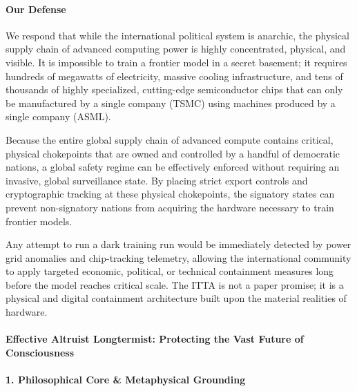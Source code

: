 \paragraph{Our Defense}\label{our-defense-2}

We respond that while the international political system is anarchic,
the physical supply chain of advanced computing power is highly
concentrated, physical, and visible. It is impossible to train a
frontier model in a secret basement; it requires hundreds of megawatts
of electricity, massive cooling infrastructure, and tens of thousands of
highly specialized, cutting-edge semiconductor chips that can only be
manufactured by a single company (TSMC) using machines produced by a
single company (ASML).

Because the entire global supply chain of advanced compute contains
critical, physical chokepoints that are owned and controlled by a
handful of democratic nations, a global safety regime can be effectively
enforced without requiring an invasive, global surveillance state. By
placing strict export controls and cryptographic tracking at these
physical chokepoints, the signatory states can prevent non-signatory
nations from acquiring the hardware necessary to train frontier models.

Any attempt to run a dark training run would be immediately detected by
power grid anomalies and chip-tracking telemetry, allowing the
international community to apply targeted economic, political, or
technical containment measures long before the model reaches critical
scale. The ITTA is not a paper promise; it is a physical and digital
containment architecture built upon the material realities of hardware.

\paragraph{Effective Altruist Longtermist: Protecting the Vast Future of
Consciousness}\label{effective-altruist-longtermist-protecting-the-vast-future-of-consciousness}

\paragraph{1. Philosophical Core \& Metaphysical
Grounding}\label{philosophical-core-metaphysical-grounding-2}

